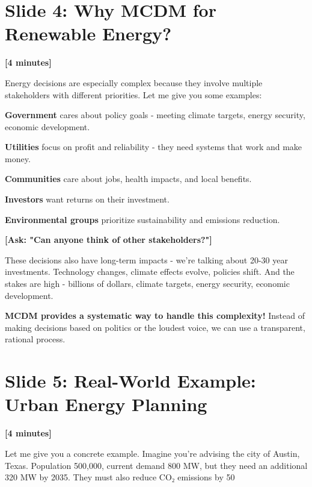 \documentclass[12pt]{article}
\begin{document}
\section*{Slide 4: Why MCDM for Renewable Energy?}
\textcolor{timing}{\textbf{[4 minutes]}}

Energy decisions are especially complex because they involve multiple stakeholders with different priorities. Let me give you some examples:

\textcolor{emphasis}{\textbf{Government}} cares about policy goals - meeting climate targets, energy security, economic development.

\textcolor{emphasis}{\textbf{Utilities}} focus on profit and reliability - they need systems that work and make money.

\textcolor{emphasis}{\textbf{Communities}} care about jobs, health impacts, and local benefits.

\textcolor{emphasis}{\textbf{Investors}} want returns on their investment.

\textcolor{emphasis}{\textbf{Environmental groups}} prioritize sustainability and emissions reduction.

\textcolor{speakernote}{\textbf{[Ask: "Can anyone think of other stakeholders?"]}}

These decisions also have long-term impacts - we're talking about 20-30 year investments. Technology changes, climate effects evolve, policies shift. And the stakes are high - billions of dollars, climate targets, energy security, economic development.

\textcolor{emphasis}{\textbf{MCDM provides a systematic way to handle this complexity!}} Instead of making decisions based on politics or the loudest voice, we can use a transparent, rational process.

\section*{Slide 5: Real-World Example: Urban Energy Planning}
\textcolor{timing}{\textbf{[4 minutes]}}

Let me give you a concrete example. Imagine you're advising the city of Austin, Texas. Population 500,000, current demand 800 MW, but they need an additional 320 MW by 2035. They must also reduce CO₂ emissions by 50%
\end{document}
